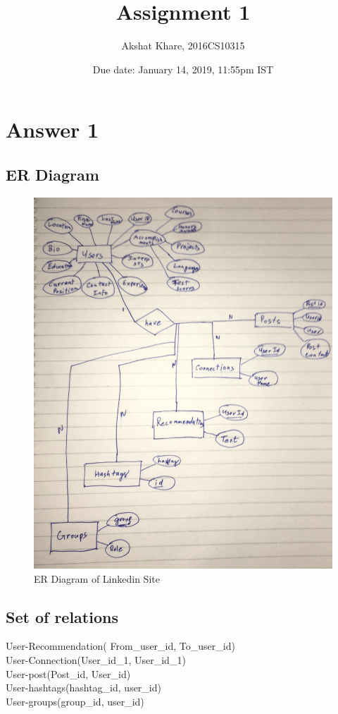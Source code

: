 \documentclass[10pt]{article}
\title{Assignment 1}
\author {Akshat Khare, 2016CS10315}
\date{Due date: January 14, 2019, 11:55pm IST}
\begin{document}
\maketitle

\section{Answer 1}
\subsection{ER Diagram}
\begin{figure}
    \centering
    \includegraphics[width=400pt]{erdiagram.jpg}
    \caption{ER Diagram of Linkedin Site}
    \label{fig:my_label}
\end{figure}
\subsection{Set of relations}
User-Recommendation( From\_user\_id, To\_user\_id) \\
User-Connection(User\_id\_1, User\_id\_1) \\
User-post(Post\_id, User\_id) \\
User-hashtags(hashtag\_id, user\_id) \\
User-groups(group\_id, user\_id) \\
\end{document}
